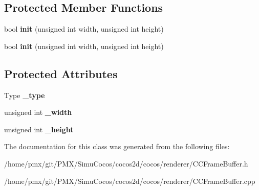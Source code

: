\subsection*{Protected Member Functions}
\begin{DoxyCompactItemize}
\item 
\mbox{\label{classexperimental_1_1RenderTargetBase_ae37534248776fc586376d3de3552a1a4}} 
bool {\bfseries init} (unsigned int width, unsigned int height)
\item 
\mbox{\label{classexperimental_1_1RenderTargetBase_ae37534248776fc586376d3de3552a1a4}} 
bool {\bfseries init} (unsigned int width, unsigned int height)
\end{DoxyCompactItemize}
\subsection*{Protected Attributes}
\begin{DoxyCompactItemize}
\item 
\mbox{\label{classexperimental_1_1RenderTargetBase_a048506ea257e2635e34dfd3257b314a3}} 
Type {\bfseries \+\_\+type}
\item 
\mbox{\label{classexperimental_1_1RenderTargetBase_af6e9f1bd836fbf1c20a2561372c771e8}} 
unsigned int {\bfseries \+\_\+width}
\item 
\mbox{\label{classexperimental_1_1RenderTargetBase_ab3f2c4339ab83542d2c6618c53c1fd52}} 
unsigned int {\bfseries \+\_\+height}
\end{DoxyCompactItemize}


The documentation for this class was generated from the following files\+:\begin{DoxyCompactItemize}
\item 
/home/pmx/git/\+P\+M\+X/\+Simu\+Cocos/cocos2d/cocos/renderer/C\+C\+Frame\+Buffer.\+h\item 
/home/pmx/git/\+P\+M\+X/\+Simu\+Cocos/cocos2d/cocos/renderer/C\+C\+Frame\+Buffer.\+cpp\end{DoxyCompactItemize}
